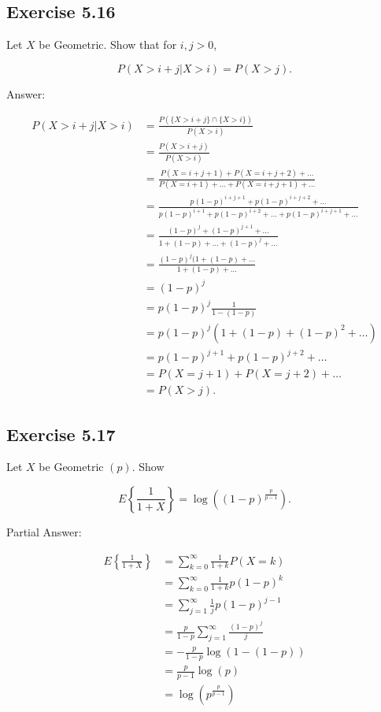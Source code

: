 \documentclass{article}
\begin{document}
\subsection*{Exercise 5.16}

Let $X$ be Geometric. Show that for $i,j > 0$,

$$
P(X > i+j \vert  X > i) = P(X > j).
$$

Answer:

\begin{align*}
P(X > i+j \vert  X > i)
&= \frac{P(\{X > i+j\} \cap \{X > i\})}{P(X > i)} \\
&= \frac{P(X > i+j)}{P(X > i)} \\
&= \frac{P(X = i+j+1) + P(X = i+j + 2) + \dots }{P(X = i+1) + \dots +P(X = i+j+1) + \dots} \\
&= \frac{p(1-p)^{i+j+1} + p(1-p)^{i+j+2} + \dots }{p(1-p)^{i+1} + p(1-p)^{i+2} + \dots + p(1-p)^{i+j+1} + \dots}\\
&= \frac{(1-p)^j + (1-p)^{j+1} + \dots}{1 + (1-p) + \dots +(1-p)^j + \dots } \\
&= \frac{(1-p)^j(1 + (1-p) + \dots }{1 + (1-p) + \dots } \\
&= (1-p)^j \\
&= p(1-p)^j \frac{1}{1-(1-p)} \\
&= p(1-p)^j(1 + (1-p) + (1-p)^2 + \dots ) \\
&= p(1-p)^{j+1} + p(1-p)^{j+2} + \dots \\
&= P(X = j+1) + P(X = j+2) + \dots \\
&= P(X > j).
\end{align*}

\subsection*{Exercise 5.17}

Let $X$ be Geometric $(p)$. Show 

$$
E\left\lbrace\frac{1}{1+X}\right\rbrace = \log\left((1-p)^{\frac{p}{p-1}}\right).
$$

Partial Answer:

\begin{align*}
E\left\lbrace\frac{1}{1+X}\right\rbrace
&= \sum_{k = 0}^\infty \frac{1}{1+k} P\left(X = k \right) \\
&= \sum_{k=0}^\infty \frac{1}{1+k} p(1-p)^k \\
&= \sum_{j=1}^\infty \frac{1}{j}p(1-p)^{j-1} \\
&= \frac{p}{1-p}\sum_{j=1}^\infty \frac{(1-p)^j}{j} \\
&= -\frac{p}{1-p}\log(1 - (1-p)) \\
&= \frac{p}{p-1}\log(p) \\
&= \log \left(p^{\frac{p}{p-1}}\right) \\
\end{align*}
\end{document}
